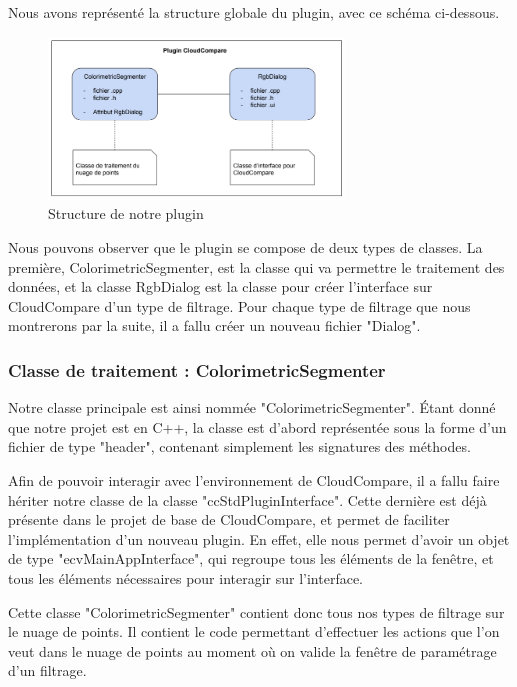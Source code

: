 \documentclass[12pt,titlepage,french]{article}
\begin{document}
Nous avons représenté la structure globale du plugin, avec ce schéma ci-dessous.

\begin{figure}[H]
\center
  \includegraphics[width=0.7\textwidth]{./img/architecture_plugin.PNG}
  \caption{\label{} Structure de notre plugin}
\end{figure}

Nous pouvons observer que le plugin se compose de deux types de classes. La première, ColorimetricSegmenter, est la classe qui va permettre le traitement des données, et la classe RgbDialog est la classe pour créer l'interface sur CloudCompare d'un type de filtrage. Pour chaque type de filtrage que nous montrerons par la suite, il a fallu créer un nouveau fichier "Dialog".

\subsubsection{Classe de traitement : ColorimetricSegmenter}

Notre classe principale est ainsi nommée "ColorimetricSegmenter". Étant donné que notre projet est en C++, la classe est d'abord représentée sous la forme d'un fichier de type "header", contenant simplement les signatures des méthodes. \newline

Afin de pouvoir interagir avec l'environnement de CloudCompare, il a fallu faire hériter notre classe de la classe "ccStdPluginInterface". Cette dernière est déjà présente dans le projet de base de CloudCompare, et permet de faciliter l'implémentation d'un nouveau plugin. En effet, elle nous permet d'avoir un objet de type "ecvMainAppInterface", qui regroupe tous les éléments de la fenêtre, et tous les éléments nécessaires pour interagir sur l'interface. \newline

Cette classe "ColorimetricSegmenter" contient donc tous nos types de filtrage sur le nuage de points. Il contient le code permettant d'effectuer les actions que l'on veut dans le nuage de points au moment où on valide la fenêtre de paramétrage d'un filtrage. \newline
\end{document}
